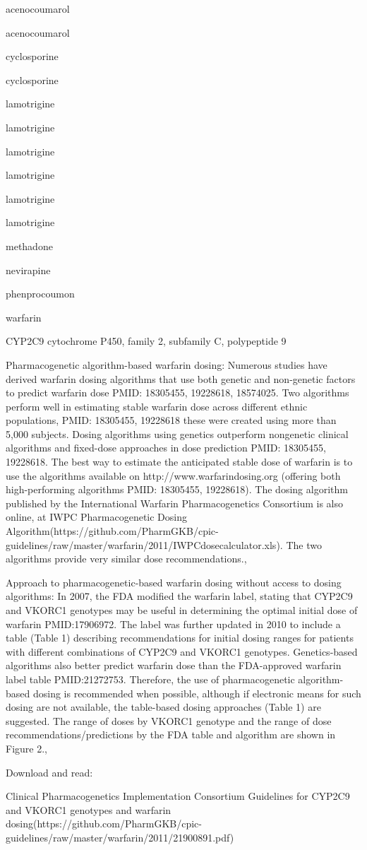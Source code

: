\documentclass{resume} %
\begin{document}
\begin{rSection}{ acenocoumarol }
\begin{rSection}{ acenocoumarol }
\begin{rSection}{ cyclosporine }
\begin{rSection}{ cyclosporine }
\begin{rSection}{ lamotrigine }
\begin{rSection}{ lamotrigine }
\begin{rSection}{ lamotrigine }
\begin{rSection}{ lamotrigine }
\begin{rSection}{ lamotrigine }
\begin{rSection}{ lamotrigine }
\begin{rSection}{ methadone }
\begin{rSection}{ nevirapine }
\begin{rSection}{ phenprocoumon }
\begin{rSection}{ warfarin }
\begin{rSubsection}{ CYP2C9 }{ cytochrome P450, family 2, subfamily C, polypeptide 9 }{}{}
\item Pharmacogenetic algorithm-based warfarin dosing: Numerous studies have derived warfarin dosing algorithms that use both genetic and non-genetic factors to predict warfarin dose PMID: 18305455, 19228618, 18574025. Two algorithms perform well in estimating stable warfarin dose across different ethnic populations,  PMID: 18305455, 19228618 these were created using more than 5,000 subjects. Dosing algorithms using genetics outperform nongenetic clinical algorithms and fixed-dose approaches in dose prediction PMID: 18305455, 19228618. The best way to estimate the anticipated stable dose of warfarin is to use the algorithms available on http://www.warfarindosing.org (offering both high-performing algorithms PMID: 18305455, 19228618). The dosing algorithm published by the International Warfarin Pharmacogenetics Consortium is also online, at IWPC Pharmacogenetic Dosing Algorithm(https://github.com/PharmGKB/cpic-guidelines/raw/master/warfarin/2011/IWPCdosecalculator.xls). The two algorithms provide very similar dose recommendations., 
 \newline
\item Approach to pharmacogenetic-based warfarin dosing without access to dosing algorithms:     In 2007, the FDA modified the warfarin label, stating that CYP2C9 and VKORC1 genotypes may be useful in determining the optimal initial dose of warfarin PMID:17906972. The label was further updated in 2010 to include a table (Table 1) describing recommendations for initial dosing ranges for patients with different combinations of CYP2C9 and VKORC1 genotypes. Genetics-based algorithms also better predict warfarin dose than the FDA-approved warfarin label table PMID:21272753. Therefore, the use of pharmacogenetic algorithm-based dosing is recommended when possible, although if electronic means for such dosing are not available, the table-based dosing approaches (Table 1) are suggested. The range of doses by VKORC1 genotype and the range of dose recommendations/predictions by the FDA table and algorithm are shown in Figure 2., 
 \newline
\item Download and read: 
 \newline
\item Clinical Pharmacogenetics Implementation Consortium Guidelines for CYP2C9 and VKORC1 genotypes and warfarin dosing(https://github.com/PharmGKB/cpic-guidelines/raw/master/warfarin/2011/21900891.pdf)
 \newline

\end{rSubsection}
\end{rSection}
\end{rSection}
\end{rSection}
\end{rSection}
\end{rSection}
\end{rSection}
\end{rSection}
\end{rSection}
\end{rSection}
\end{rSection}
\end{rSection}
\end{rSection}
\end{rSection}
\end{rSection}
\end{document}
